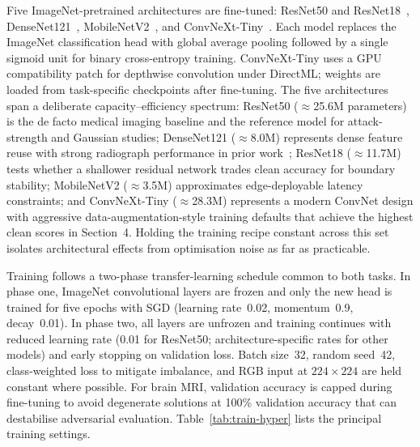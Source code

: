 \documentclass[12pt,a4paper,oneside]{report}
\begin{document}

Five ImageNet-pretrained architectures are fine-tuned: ResNet50 and ResNet18~\cite{he2016deep}, DenseNet121~\cite{huang2017densely}, MobileNetV2~\cite{sandler2018mobilenetv2}, and ConvNeXt-Tiny~\cite{liu2022convnet}. Each model replaces the ImageNet classification head with global average pooling followed by a single sigmoid unit for binary cross-entropy training. ConvNeXt-Tiny uses a GPU compatibility patch for depthwise convolution under DirectML; weights are loaded from task-specific checkpoints after fine-tuning. The five architectures span a deliberate capacity--efficiency spectrum: ResNet50 ($\approx$25.6M parameters) is the de facto medical imaging baseline and the reference model for attack-strength and Gaussian studies; DenseNet121 ($\approx$8.0M) represents dense feature reuse with strong radiograph performance in prior work~\cite{rajpurkar2017chexnet}; ResNet18 ($\approx$11.7M) tests whether a shallower residual network trades clean accuracy for boundary stability; MobileNetV2 ($\approx$3.5M) approximates edge-deployable latency constraints; and ConvNeXt-Tiny ($\approx$28.3M) represents a modern ConvNet design with aggressive data-augmentation-style training defaults that achieve the highest clean scores in Section~4. Holding the training recipe constant across this set isolates architectural effects from optimisation noise as far as practicable.

Training follows a two-phase transfer-learning schedule common to both tasks. In phase one, ImageNet convolutional layers are frozen and only the new head is trained for five epochs with SGD (learning rate~0.02, momentum~0.9, decay~0.01). In phase two, all layers are unfrozen and training continues with reduced learning rate (0.01 for ResNet50; architecture-specific rates for other models) and early stopping on validation loss. Batch size~32, random seed~42, class-weighted loss to mitigate imbalance, and RGB input at $224 \times 224$ are held constant where possible. For brain MRI, validation accuracy is capped during fine-tuning to avoid degenerate solutions at 100\% validation accuracy that can destabilise adversarial evaluation. Table~\ref{tab:train-hyper} lists the principal training settings.
\end{document}

